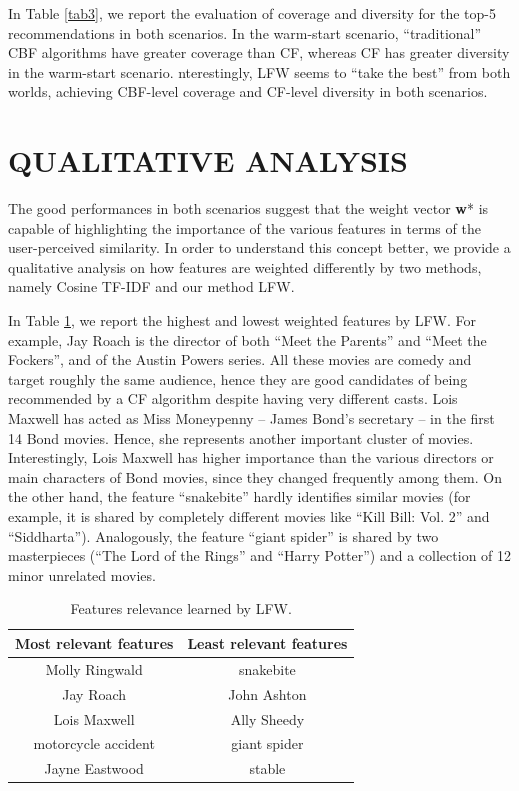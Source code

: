 \documentclass{sig-alternate}
\begin{document}
In Table \ref{tab3}, we report the evaluation of coverage and diversity for
the top-5 recommendations in both scenarios. In the warm-start scenario,
``traditional'' CBF algorithms have greater coverage than CF,
whereas CF has greater diversity in the warm-start scenario. nterestingly,
LFW seems to ``take the best'' from both worlds, achieving
CBF-level coverage and CF-level diversity in both scenarios.

\section{QUALITATIVE ANALYSIS}
The good performances in both scenarios suggest that the weight
vector \textbf{w}* is capable of highlighting the importance of the various
features in terms of the user-perceived similarity. In order to understand
this concept better, we provide a qualitative analysis on how
features are weighted differently by two methods, namely Cosine
TF-IDF and our method LFW.

In Table \ref{tab4}, we report the highest and lowest weighted features
by LFW. For example, Jay Roach is the director of both “Meet the
Parents” and ``Meet the Fockers'', and of the Austin Powers series.
All these movies are comedy and target roughly the same audience,
hence they are good candidates of being recommended by a CF
algorithm despite having very different casts. Lois Maxwell has
acted as Miss Moneypenny – James Bond’s secretary – in the first
14 Bond movies. Hence, she represents another important cluster
of movies. Interestingly, Lois Maxwell has higher importance than
the various directors or main characters of Bond movies, since
they changed frequently among them. On the other hand, the
feature “snakebite” hardly identifies similar movies
 (for example, it
is shared by completely different movies like ``Kill Bill: Vol. 2'' and
``Siddharta''). Analogously, the feature “giant spider” is shared by
two masterpieces (``The Lord of the Rings'' and ``Harry Potter'') and
a collection of 12 minor unrelated movies.

\begin{table}[ht]
    \centering
    \caption{Features relevance learned by LFW. }
    \label{tab4}
    \begin{tabular}{cc}
        \hline
        Most relevant features & Least relevant features \\ \hline
        Molly Ringwald         & snakebite               \\
        Jay Roach              & John Ashton             \\
        Lois Maxwell           & Ally Sheedy             \\
        motorcycle accident    & giant spider            \\
        Jayne Eastwood         & stable                  \\ \hline
    \end{tabular}
\end{table}
\end{document}
